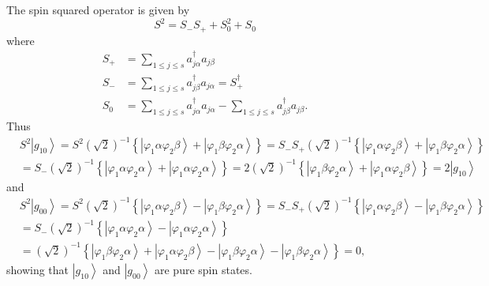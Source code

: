 \documentclass[aps,preprint]{revtex4}%
\begin{document}
The spin squared operator is given by
\[
S^{2}=S_{-}S_{+}+S_{0}^{2}+S_{0}%
\]
where
\begin{align*}
S_{+}  &  =\sum_{1\leq j\leq s}a_{j\alpha}^{\dagger}a_{j\beta}\\
S_{-}  &  =\sum_{1\leq j\leq s}a_{j\beta}^{\dagger}a_{j\alpha}=S_{+}^{\dagger
}\\
S_{0}  &  =\sum_{1\leq j\leq s}a_{j\alpha}^{\dagger}a_{j\alpha}-\sum_{1\leq
j\leq s}a_{j\beta}^{\dagger}a_{j\beta}.
\end{align*}
Thus
\begin{align*}
&  S^{2}\left\vert g_{10}\right\rangle =S^{2}\left(  \sqrt{2}\right)
^{-1}\left\{  \left\vert \varphi_{1}\alpha\varphi_{2}\beta\right\rangle
+\left\vert \varphi_{1}\beta\varphi_{2}\alpha\right\rangle \right\}
=S_{-}S_{+}\left(  \sqrt{2}\right)  ^{-1}\left\{  \left\vert \varphi_{1}%
\alpha\varphi_{2}\beta\right\rangle +\left\vert \varphi_{1}\beta\varphi
_{2}\alpha\right\rangle \right\} \\
&  =S_{-}\left(  \sqrt{2}\right)  ^{-1}\left\{  \left\vert \varphi_{1}%
\alpha\varphi_{2}\alpha\right\rangle +\left\vert \varphi_{1}\alpha\varphi
_{2}\alpha\right\rangle \right\}  =2\left(  \sqrt{2}\right)  ^{-1}\left\{
\left\vert \varphi_{1}\beta\varphi_{2}\alpha\right\rangle +\left\vert
\varphi_{1}\alpha\varphi_{2}\beta\right\rangle \right\}  =2\left\vert
g_{10}\right\rangle
\end{align*}
and
\begin{align*}
&  S^{2}\left\vert g_{00}\right\rangle =S^{2}\left(  \sqrt{2}\right)
^{-1}\left\{  \left\vert \varphi_{1}\alpha\varphi_{2}\beta\right\rangle
-\left\vert \varphi_{1}\beta\varphi_{2}\alpha\right\rangle \right\}
=S_{-}S_{+}\left(  \sqrt{2}\right)  ^{-1}\left\{  \left\vert \varphi_{1}%
\alpha\varphi_{2}\beta\right\rangle -\left\vert \varphi_{1}\beta\varphi
_{2}\alpha\right\rangle \right\} \\
&  =S_{-}\left(  \sqrt{2}\right)  ^{-1}\left\{  \left\vert \varphi_{1}%
\alpha\varphi_{2}\alpha\right\rangle -\left\vert \varphi_{1}\alpha\varphi
_{2}\alpha\right\rangle \right\} \\
&  =\left(  \sqrt{2}\right)  ^{-1}\left\{  \left\vert \varphi_{1}\beta
\varphi_{2}\alpha\right\rangle +\left\vert \varphi_{1}\alpha\varphi_{2}%
\beta\right\rangle -\left\vert \varphi_{1}\beta\varphi_{2}\alpha\right\rangle
-\left\vert \varphi_{1}\beta\varphi_{2}\alpha\right\rangle \right\}  =0,
\end{align*}
showing that $\left\vert g_{10}\right\rangle $ and $\left\vert g_{00}%
\right\rangle $ are pure spin states.
\end{document}
